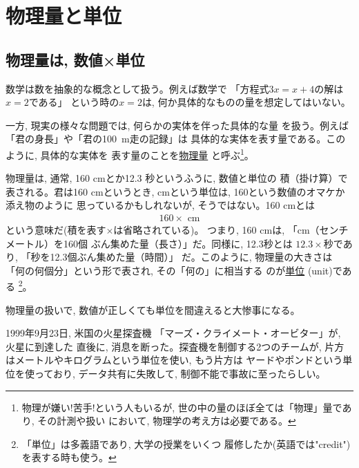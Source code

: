 \chapter{物理量と単位}\label{chapt:dim_unit}

\section{物理量は, 数値×単位}\label{sect:dimension}

数学は数を抽象的な概念として扱う。例えば数学で
「方程式$3x=x+4$の解は$x=2$である」
という時の$x=2$は, 何か具体的なものの量を想定してはいない。

一方, 現実の様々な問題では, 何らかの実体を伴った具体的な量
を扱う。例えば「君の身長」や「君の100~m走の記録」は
具体的な実体を表す量である。このように, 具体的な実体を
表す量のことを\underline{物理量}
と呼ぶ\footnote{物理が嫌い!苦手!という人もいるが, 
世の中の量のほぼ全ては「物理」量であり, その計測や扱い
において, 物理学の考え方は必要である。}。

物理量は, 通常, 160 cmとか12.3 秒というふうに, 数値と単位の
積（掛け算）で表される。君は160 cmというとき, 
cmという単位は, 160という数値のオマケか添え物のように
思っているかもしれないが, そうではない。160 cmとは
\begin{eqnarray}
160 \times\text{ cm}
\end{eqnarray}
という意味だ(積を表す$\times$は省略されている)。
つまり, 160 cmは, 「cm（センチメートル）を160個
ぶん集めた量（長さ）」だ。同様に, 12.3秒とは
$12.3\times$秒であり, 「秒を12.3個ぶん集めた量（時間）」
だ。このように, 物理量の大きさは
「何の何個分」という形で表され, その「何の」に相当する
のが\underline{単位} (unit)である
\footnote{「単位」は多義語であり, 大学の授業をいくつ
履修したか(英語では"credit")を表する時も使う。}。

物理量の扱いで, 数値が正しくても単位を間違えると大惨事になる。

\begin{exmpl} 1999年9月23日, 米国の火星探査機
「マーズ・クライメート・オービター」が, 火星に到達した
直後に, 消息を断った。探査機を制御する2つのチームが, 
片方はメートルやキログラムという単位を使い, もう片方は
ヤードやポンドという単位を使っており, データ共有に失敗して, 
制御不能で事故に至ったらしい。\end{exmpl}


